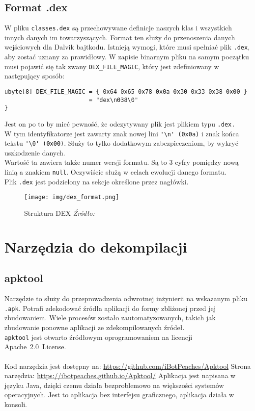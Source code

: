 \documentclass[12pt,a4paper,leqno,oneside,titlepage]{book}
\begin{document}
\section{Format .dex}
%
W pliku \verb|classes.dex| są przechowywane definicje naszych klas\cite{AndroidSourceDexFormat} i wszystkich innych danych im towarzyszących.
Format ten służy do przenoszenia danych wejściowych dla Dalvik bajtkodu.
Istnieją wymogi\cite{DalvikConstrains}, które musi spełniać plik \verb|.dex|, aby zostać uznany za prawidłowy.
%
W zapisie binarnym pliku na samym początku musi pojawić się tak zwany \verb|DEX_FILE_MAGIC|, który jest zdefiniowany w następujący sposób:\cite{AndroidSourceDexFormat}
\begin{lstlisting}
ubyte[8] DEX_FILE_MAGIC = { 0x64 0x65 0x78 0x0a 0x30 0x33 0x38 0x00 }
                        = "dex\n038\0"
}
\end{lstlisting}
Jest on po to by mieć pewność, że odczytywany plik jest plikiem typu \verb|.dex.|\\
W tym identyfikatorze jest zawarty znak nowej lini \verb|'\n' (0x0a)| i znak końca tekstu \verb|'\0' (0x00)|. Służy to tylko dodatkowym zabezpieczeniom, by wykryć uszkodzenie danych.
\\
Wartość ta zawiera także numer wersji formatu. Są to 3 cyfry pomiędzy nową linią a znakiem \verb|null|. Oczywiście służą w celach ewolucji danego formatu.
\\
Plik \verb|.dex| jest podzielony na sekcje określone przez nagłówki\cite{AndroidSourceDexFormat}.
%
\begin{figure}[H]
	\centering
	\texttt{[image: img/dex\_format.png]}
	\caption{Struktura DEX \emph{Źródło: \cite{DiveIntoDex}}}
\end{figure}
%
%
\chapter{Narzędzia do dekompilacji}
%
\section{apktool}
%
Narzędzie to służy do przeprowadzenia odwrotnej inżynierii na wskazanym pliku \verb|.apk|. Potrafi zdekodować źródła aplikacji do formy zbliżonej przed jej zbudowaniem. Wiele procesów zostało zautomatyzowanych, takich jak zbudowanie ponowne aplikacji ze zdekompilowanych źródeł. \\
\lstinline|apktool| jest otwarto źródłowym oprogramowaniem na licencji \mbox{Apache 2.0 License.} \\
\\
Kod narzędzia jest dostępny na: \url{https://github.com/iBotPeaches/Apktool} \newline
Strona narzędzia: \url{https://ibotpeaches.github.io/Apktool/}
\newline
\newline
Aplikacja jest napisana w języku Java, dzięki czemu działa bezproblemowo na większości systemów operacyjnych. Jest to aplikacja bez interfejsu graficznego, aplikacja działa w konsoli.
\end{document}
